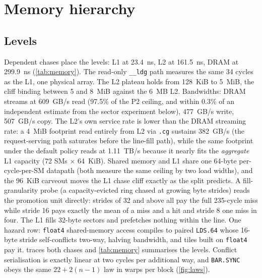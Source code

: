 \section{Memory hierarchy}
\label{sec:memory}

\subsection{Levels}

Dependent chases place the levels: L1 at 23.4~ns, L2 at 161.5~ns, DRAM
at 299.9~ns (\cref{tab:memory}). The read-only \texttt{\_\_ldg} path measures
the same 34 cycles as the L1, one physical array. The L2 plateau holds
from 128~KiB to 5~MiB, the cliff binding between 5 and 8~MiB against
the 6~MB L2.
Bandwidths: DRAM streams at 609~GB/s read (97.5\% of the P2 ceiling, and
within 0.3\% of an independent estimate from the sector experiment
below), 477~GB/s write, 507~GB/s copy. The L2's own service rate is lower than the
DRAM streaming rate: a 4~MiB footprint read entirely from L2 via
\texttt{.cg} sustains 382~GB/s (the request-serving path saturates
before the line-fill path), while the same footprint under the default
policy reads at 1.11~TB/s because it nearly fits the \emph{aggregate} L1
capacity (72 SMs $\times$ 64~KiB). Shared memory and L1 share one 64-byte
per-cycle-per-SM datapath (both measure the same ceiling by two load
widths), and the 96~KiB carveout moves the L1 chase cliff exactly as the
split predicts. A fill-granularity probe (a capacity-evicted ring chased
at growing byte strides) reads the promotion unit directly: strides of
32 and above all pay the full 235-cycle miss while stride 16 pays
exactly the mean of a miss and a hit and stride 8 one miss in four.
The L1 fills 32-byte sectors and prefetches nothing within the line.
One hazard row: \texttt{float4} shared-memory access
compiles to paired \texttt{LDS.64} whose 16-byte stride self-conflicts
two-way, halving bandwidth, and tiles built on \texttt{float4} pay it.
 traces both chases and \cref{tab:memory} summarises
the levels. Conflict serialisation is exactly linear at two cycles per
additional way, and \texttt{BAR.SYNC} obeys the same
$22 + 2(n{-}1)$ law in warps per block (\cref{fig:laws}).

\begin{table}[t]
\centering
\caption{Memory-hierarchy summary. Cycle-domain rows at the locked
1455~MHz, bandwidth rows against the P2 memory state
(\cref{sec:methodology}). The L2 row pair separates the request-serving
\texttt{.cg} path from the aggregate-L1 effect under the default policy.}
\label{tab:memory}
\small

\end{table}

